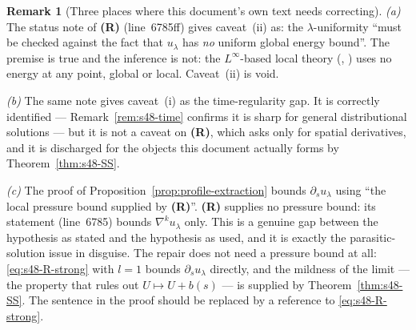 \documentclass[11pt]{article}
\theoremstyle{definition}
\newtheorem{remark}[theorem]{Remark}
\theoremstyle{remark}
\begin{document}
\begin{remark}[Three places where this document's own text needs correcting]
  \label{rem:s48-doc-errors}
  \emph{(a)} The status note of \textbf{(R)} (line~6785ff) gives caveat~(ii)
  as: the $\lambda$-uniformity ``must be checked against the fact that
  $u_\lambda$ has \emph{no} uniform global energy bound''. The premise is
  true and the inference is not: the $L^\infty$-based local theory
  (\cite[\S4]{KNSS2009}, \cite[Thm.~2.4]{SereginSverak2009}) uses no energy
  at any point, global or local. Caveat~(ii) is void.

  \emph{(b)} The same note gives caveat~(i) as the time-regularity gap. It is
  correctly identified --- Remark~\ref{rem:s48-time} confirms it is sharp for
  general distributional solutions --- but it is not a caveat on \textbf{(R)},
  which asks only for spatial derivatives, and it is discharged for the
  objects this document actually forms by Theorem~\ref{thm:s48-SS}.

  \emph{(c)} The proof of Proposition~\ref{prop:profile-extraction} bounds
  $\partial_su_\lambda$ using ``the local pressure bound supplied by
  \textbf{(R)}''. \textbf{(R)} supplies no pressure bound: its statement
  (line~6785) bounds $\nabla^ku_\lambda$ only. This is a genuine gap between
  the hypothesis as stated and the hypothesis as used, and it is exactly the
  parasitic-solution issue in disguise. The repair does not need a pressure
  bound at all: \eqref{eq:s48-R-strong} with $l=1$ bounds
  $\partial_su_\lambda$ directly, and the mildness of the limit ---
  the property that rules out $U\mapsto U+b(s)$ --- is supplied by
  Theorem~\ref{thm:s48-SS}. The sentence in the proof should be replaced by a
  reference to \eqref{eq:s48-R-strong}.
\end{remark}
\end{document}
